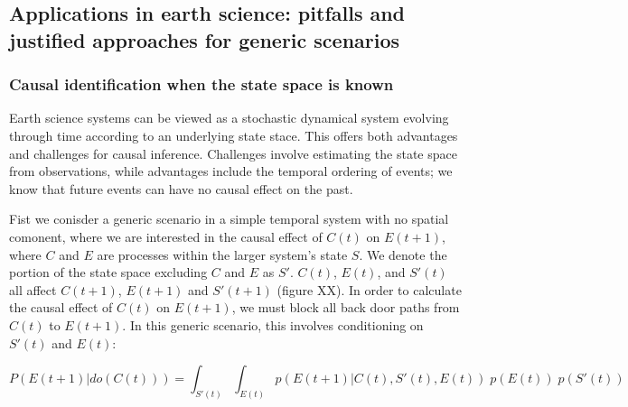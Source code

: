 \documentclass[12pt]{article}
\begin{document}

\subsection{Applications in earth science: pitfalls and justified
  approaches for generic scenarios}


\subsubsection{Causal identification when the state space is known}



Earth science systems can be viewed as a stochastic dynamical system
evolving through time according to an underlying state stace. This
offers both advantages and challenges for causal inference. Challenges
involve estimating the state space from observations, while advantages
include the temporal ordering of events; we know that future events
can have no causal effect on the past.

Fist we conisder a generic scenario in a simple temporal system with
no spatial comonent, where we are interested in the causal effect of
$C(t)$ on $E(t+1)$, where $C$ and $E$ are processes within the larger
system's state $S$. We denote the portion of the state space excluding
$C$ and $E$ as $S'$. $C(t)$, $E(t)$, and $S'(t)$ all affect $C(t+1)$,
$E(t+1)$ and $S'(t+1)$ (figure XX). In order to calculate the causal
effect of $C(t)$ on $E(t+1)$, we must block all back door paths from
$C(t)$ to $E(t+1)$. In this generic scenario, this involves
conditioning on $S'(t)$ and $E(t)$:

\begin{equation}
  \label{naive}
  P(E(t+1)| do(C(t))) = \int_{S'(t)} \int_{E(t)} p(E(t+1) | C(t), S'(t),
  E(t)) \; p(E(t)) \; p(S'(t))
\end{equation}
\end{document}
